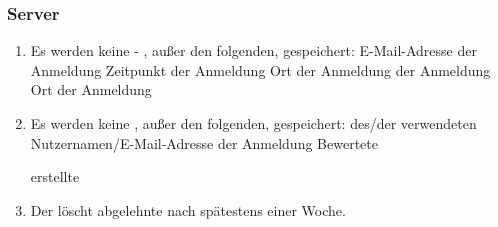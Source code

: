 \subsubsection{Server}

\begin{enumerate}
    \item Es werden keine %
        -%
        , außer den folgenden, gespeichert:
        \subitem E-Mail-Adresse der Anmeldung
        \subitem Zeitpunkt der Anmeldung
        \subitem Ort der Anmeldung
        \subitem %
            der Anmeldung
        \subitem Ort der Anmeldung
    \item Es werden keine %
        , außer den folgenden, gespeichert:
        \subitem %
            des/der verwendeten Nutzernamen/E-Mail-Adresse der Anmeldung
        \subitem Bewertete %

        \subitem erstellte %

    \item Der %
        löscht abgelehnte %
            nach spätestens einer Woche.
\end{enumerate}